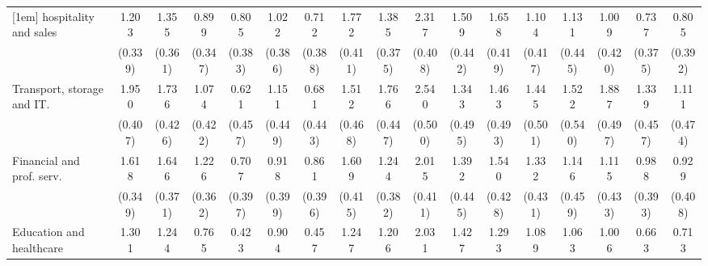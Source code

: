 {\begin{tabular}{l*{16}{c}}
[1em]
hospitality and sales&       1.203\sym{***}&       1.355\sym{***}&       0.899\sym{**} &       0.805\sym{*}  &       1.022\sym{**} &       0.712         &       1.772\sym{***}&       1.385\sym{***}&       2.317\sym{***}&       1.509\sym{***}&       1.658\sym{***}&       1.104\sym{**} &       1.131\sym{*}  &       1.009\sym{*}  &       0.737\sym{*}  &       0.805\sym{*}  \\
                    &     (0.339)         &     (0.361)         &     (0.347)         &     (0.383)         &     (0.386)         &     (0.388)         &     (0.411)         &     (0.375)         &     (0.408)         &     (0.442)         &     (0.419)         &     (0.417)         &     (0.445)         &     (0.420)         &     (0.375)         &     (0.392)         \\
[1em]
Transport, storage and IT.&       1.950\sym{***}&       1.736\sym{***}&       1.074\sym{*}  &       0.621         &       1.151\sym{*}  &       0.681         &       1.512\sym{**} &       1.766\sym{***}&       2.540\sym{***}&       1.343\sym{**} &       1.463\sym{**} &       1.445\sym{**} &       1.522\sym{**} &       1.887\sym{***}&       1.339\sym{**} &       1.111\sym{*}  \\
                    &     (0.407)         &     (0.426)         &     (0.422)         &     (0.457)         &     (0.449)         &     (0.443)         &     (0.468)         &     (0.447)         &     (0.500)         &     (0.495)         &     (0.493)         &     (0.501)         &     (0.540)         &     (0.497)         &     (0.457)         &     (0.474)         \\
[1em]
Financial and prof. serv.&       1.618\sym{***}&       1.646\sym{***}&       1.226\sym{***}&       0.707         &       0.918\sym{*}  &       0.861\sym{*}  &       1.609\sym{***}&       1.244\sym{**} &       2.015\sym{***}&       1.392\sym{**} &       1.540\sym{***}&       1.332\sym{**} &       1.146\sym{*}  &       1.115\sym{*}  &       0.988\sym{*}  &       0.929\sym{*}  \\
                    &     (0.349)         &     (0.371)         &     (0.362)         &     (0.397)         &     (0.399)         &     (0.396)         &     (0.415)         &     (0.382)         &     (0.411)         &     (0.445)         &     (0.428)         &     (0.431)         &     (0.459)         &     (0.433)         &     (0.393)         &     (0.408)         \\
[1em]
Education and healthcare&       1.301\sym{***}&       1.244\sym{***}&       0.765\sym{*}  &       0.423         &       0.904\sym{*}  &       0.457         &       1.247\sym{**} &       1.206\sym{**} &       2.031\sym{***}&       1.427\sym{**} &       1.293\sym{**} &       1.089\sym{*}  &       1.063\sym{*}  &       1.006\sym{*}  &       0.663         &       0.713         \\

\end{tabular}}
